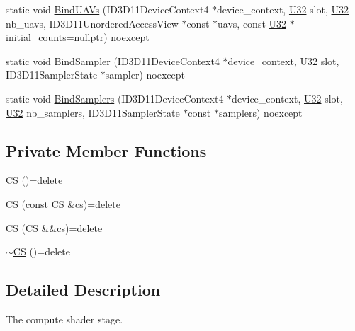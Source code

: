 \begin{DoxyCompactItemize}
\item 
static void \hyperlink{structmage_1_1_pipeline_1_1_c_s_ac3284bea11459d523bb554dfd8fa1c7a}{Bind\+U\+A\+Vs} (I\+D3\+D11\+Device\+Context4 $\ast$device\+\_\+context, \hyperlink{namespacemage_a41c104c036fba3756a74e19f793eeaa1}{U32} slot, \hyperlink{namespacemage_a41c104c036fba3756a74e19f793eeaa1}{U32} nb\+\_\+uavs, I\+D3\+D11\+Unordered\+Access\+View $\ast$const $\ast$uavs, const \hyperlink{namespacemage_a41c104c036fba3756a74e19f793eeaa1}{U32} $\ast$initial\+\_\+counts=nullptr) noexcept
\item 
static void \hyperlink{structmage_1_1_pipeline_1_1_c_s_a36ebe653d0bcce1efcc59bd39d511310}{Bind\+Sampler} (I\+D3\+D11\+Device\+Context4 $\ast$device\+\_\+context, \hyperlink{namespacemage_a41c104c036fba3756a74e19f793eeaa1}{U32} slot, I\+D3\+D11\+Sampler\+State $\ast$sampler) noexcept
\item 
static void \hyperlink{structmage_1_1_pipeline_1_1_c_s_a647588900261379c9f6e96c191c0c0f7}{Bind\+Samplers} (I\+D3\+D11\+Device\+Context4 $\ast$device\+\_\+context, \hyperlink{namespacemage_a41c104c036fba3756a74e19f793eeaa1}{U32} slot, \hyperlink{namespacemage_a41c104c036fba3756a74e19f793eeaa1}{U32} nb\+\_\+samplers, I\+D3\+D11\+Sampler\+State $\ast$const $\ast$samplers) noexcept
\end{DoxyCompactItemize}
\subsection*{Private Member Functions}
\begin{DoxyCompactItemize}
\item 
\hyperlink{structmage_1_1_pipeline_1_1_c_s_a83cfca7bdab3af17ffbcf42efe76aab0}{CS} ()=delete
\item 
\hyperlink{structmage_1_1_pipeline_1_1_c_s_ab982a32a1a70e7fb85c94ab521b1c24e}{CS} (const \hyperlink{structmage_1_1_pipeline_1_1_c_s}{CS} \&cs)=delete
\item 
\hyperlink{structmage_1_1_pipeline_1_1_c_s_a82979b128dde2f2750813986cbf69903}{CS} (\hyperlink{structmage_1_1_pipeline_1_1_c_s}{CS} \&\&cs)=delete
\item 
\hyperlink{structmage_1_1_pipeline_1_1_c_s_a8061d73f9cc268ce883dd0fd3c9f094c}{$\sim$\+CS} ()=delete
\end{DoxyCompactItemize}


\subsection{Detailed Description}
The compute shader stage. 

